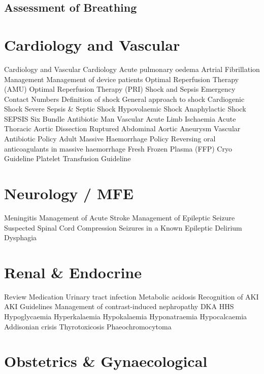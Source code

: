 \documentclass[]{book}
\begin{document}
\hypertarget{assessment-of-breathing}{%
\section{Assessment of Breathing}\label{assessment-of-breathing}}

\hypertarget{cardiovasc}{%
\chapter{Cardiology and Vascular}\label{cardiovasc}}

Cardiology and Vascular
Cardiology
Acute pulmonary oedema
Artrial Fibrillation Management
Management of device patients
Optimal Reperfusion Therapy (AMU)
Optimal Reperfusion Therapy (PRI)
Shock and Sepsis
Emergency Contact Numbers
Definition of shock
General approach to shock
Cardiogenic Shock
Severe Sepsis \& Septic Shock
Hypovolaemic Shock
Anaphylactic Shock
SEPSIS Six Bundle
Antibiotic Man
Vascular
Acute Limb Ischaemia
Acute Thoracic Aortic Dissection
Ruptured Abdominal Aortic Aneurysm
Vascular Antibiotic Policy
Adult Massive Haemorrhage Policy
Reversing oral anticoagulants in massive haemorrhage
Fresh Frozen Plasma (FFP) Cryo Guideline
Platelet Transfusion Guideline

\hypertarget{neuromfe}{%
\chapter{Neurology / MFE}\label{neuromfe}}

Meningitis
Management of Acute Stroke
Management of Epileptic Seizure
Suspected Spinal Cord Compression
Seizures in a Known Epileptic
Delirium
Dysphagia

\hypertarget{renal-endocrine}{%
\chapter{Renal \& Endocrine}\label{renal-endocrine}}

Review Medication
Urinary tract infection
Metabolic acidosis
Recognition of AKI
AKI Guidelines
Management of contrast-induced nephropathy
DKA
HHS
Hypoglycaemia
Hyperkalaemia
Hypokalaemia
Hyponatraemia
Hypocalcaemia
Addisonian crisis
Thyrotoxicosis
Phaeochromocytoma

\hypertarget{obsandgynae}{%
\chapter{Obstetrics \& Gynaecological}\label{obsandgynae}}
\end{document}
